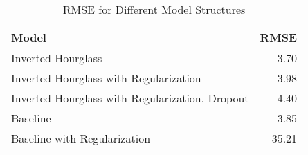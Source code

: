 \begin{table}[ht]
\centering
\caption{RMSE for Different Model Structures} 
\label{tab:model_rmse}
\begin{tabular}{lr}
  \hline
Model & RMSE \\ 
  \hline
Inverted Hourglass & 3.70 \\ 
  Inverted Hourglass with Regularization & 3.98 \\ 
  Inverted Hourglass with Regularization, Dropout & 4.40 \\ 
  Baseline & 3.85 \\ 
  Baseline with Regularization & 35.21 \\ 
   \hline
\end{tabular}
\end{table}
